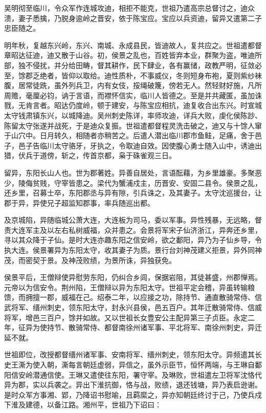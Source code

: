 \documentclass[]{article}
\begin{document}
吴明彻至临川，令众军作连城攻迪，相拒不能克，世祖乃遣高宗总督讨之，迪众溃，妻子悉擒，乃脱身逾岭之晋安，依于陈宝应。宝应以兵资迪，留异又遣第二子忠臣随之。

明年秋，复越东兴岭，东兴、南城、永成县民，皆迪故人，复共应之。世祖遣都督章昭达征迪，迪又散于山谷。初，侯景之乱也，百姓皆弃本业，群聚为盗，唯迪所部，独不侵扰，并分给田畴，督其耕作，民下肆业，各有赢储，政教严明，征敛必至，馀郡乏绝者，皆仰以取给。迪性质朴，不事威仪，冬则短身布袍，夏则紫纱袜腹，居常徒跣，虽外列兵卫，内有女伎，挼绳破篾，傍若无人。然轻财好施，凡所周赡，毫厘必钧，讷于言语，而襟怀信实，临川人皆德之。至是并共藏匿，虽加诛戮，无肯言者。昭达仍度岭，顿于建安，与陈宝应相抗，迪复收合出东兴。时宣城太守钱肃镇东兴，以城降迪。吴州刺史陈详，率师攻迪，详兵大败，虔化侯陈訬、陈留太守张遂并战死，于是迪众复振。世祖遣都督程灵洗击破之，迪又与十馀人窜于山穴中。日月转久，相随者亦稍苦之。后遣人潜出临川郡市鱼鲑，足痛，舍于邑子，邑子告临川太守骆牙，牙执之，令取迪自效。因使腹心勇士随入山中，诱迪出猎，伏兵于道傍，斩之，传首京都，枭于硃雀观三日。

留异，东阳长山人也。世为郡著姓。异善自居处，言语酝藉，为乡里雄豪。多聚恶少，陵侮贫贱，守宰皆患之。梁代为蟹浦戍主，历晋安、安固二县令。侯景之乱，还乡里，召募士卒，东阳郡丞与异有隙，引兵诛之，及其妻子。太守沈巡援台，让郡于异，异使兄子超监知郡事，率兵随巡出都。

及京城陷，异随临城公萧大连，大连板为司马，委以军事。异性残暴，无远略，督责大连军主及以左右私树威福，众并患之。会景将军宋子仙济浙江，异奔还乡里，寻以其众降于子仙。是时大连亦趣东阳之信安岭，欲之鄱阳，异乃为子仙乡导，令执大连。侯景署异为东阳太守，收其妻子为质。景行台刘神茂建义拒景，异外同神茂，而密契于景。及神茂败绩，为景所诛，异独获免。

侯景平后，王僧辩使异慰劳东阳，仍纠合乡闾，保据岩阻，其徒甚盛，州郡惮焉。元帝以为信安令。荆州陷，王僧辩以异为东阳太守。世祖平定会稽，异虽转输粮馈，而拥擅一郡，威福在己。绍泰二年，以应接之功，除持节、通直散骑常侍、信武将军、缙州刺史，领东阳太守，封永兴县侯，邑五百户。其年迁散骑常侍、信威将军，增邑三百户，馀并如故。又以世祖长女豊安公主配异第三子贞臣。永定二年，征异为使持节、散骑常侍、都督南徐州诸军事、平北将军、南徐州刺史，异迁延不就。

世祖即位，改授都督缙州诸军事、安南将军、缙州刺史，领东阳太守。异频遣其长史王澌为使入朝，澌每言朝廷虚弱，异信之，虽外示臣节，恒怀两端，与王琳自鄱阳信安岭潜通信使。王琳又遣使往东阳，署守宰。及琳败，世祖遣左卫将军沈恪代异为郡，实以兵袭之。异出下淮抗御，恪与战，败绩，退还钱塘，异乃表启逊谢。是时众军方事湘、郢，乃降诏书慰喻，且羁縻之，异亦知朝廷终讨于己，乃使兵戍下淮及建德，以备江路。湘州平，世祖乃下诏曰：
\end{document}
